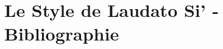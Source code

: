 \begin{comment}
\paragraph{Conversion, Prophétisme et dénonçant l'idôlatrie} "Conversion", du registre prophétique
{Laudato Si’} prend un \textit{kairos} et en ce sens, devient prophétique, car parle en situation au sein d'une crise. Mal qui perturbe le peuple et Dieu. \textit{epistrophe}, retour vers Dieu, en ayant horreur de son comportement (metanoia). 


\paragraph{Comment articuler les deux}   A la différence Dt, qui critiquait fortement les religions extérieures et toutes les compromissions, ici, il semble que nous ayons un paradoxe : positivité des religions non chrétienne et négativité des "compromissions" mais par rapport à une "religion non nommée".


\subsection{Théologie des religions}
 
\paragraph{Limites des approches pluralistes}

\paragraph{Approche retenue : la théologie de Theobald}

\subsection{Ce que les autres religions peuvent dire de la crise écologique ? }
 
\end{comment}


\section{Le Style de Laudato Si’ - Bibliographie}

